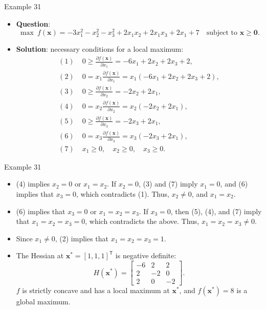 \documentclass[aspectratio=169,hyperref,UTF8,CJK]{beamer}
\newcommand{\trans}{\mathsf{T}}
\newcommand{\vect}[1]{\boldsymbol{#1}}
\begin{document}
\begin{frame}{Example 31}
  \scriptsize
  \begin{itemize}
    \item \textbf{Question}:
      \begin{equation*}
        \max\ f(\vect{x})=-3x_1^2-x_2^2-x_3^2+2x_1x_2+2x_1x_3+2x_1+7
        \quad\text{subject to }\vect{x}\ge\vect{0}.
      \end{equation*}
    \item \textbf{Solution}: necessary conditions for a local maximum:
      \begin{align*}
        (1)\;&0\ge\frac{\partial f(\vect{x})}{\partial x_1}=-6x_1+2x_2+2x_3+2,\\
        (2)\;&0=x_1\frac{\partial f(\vect{x})}{\partial x_1}=x_1(-6x_1+2x_2+2x_3+2),\\
        (3)\;&0\ge\frac{\partial f(\vect{x})}{\partial x_2}=-2x_2+2x_1,\\
        (4)\;&0=x_2\frac{\partial f(\vect{x})}{\partial x_2}=x_2(-2x_2+2x_1),\\
        (5)\;&0\ge\frac{\partial f(\vect{x})}{\partial x_3}=-2x_3+2x_1,\\
        (6)\;&0=x_3\frac{\partial f(\vect{x})}{\partial x_3}=x_3(-2x_3+2x_1),\\
        (7)\;&x_1\ge0,\quad x_2\ge0,\quad x_3\ge0.
      \end{align*}
  \end{itemize}
\end{frame}

\begin{frame}{Example 31}
  \scriptsize
  \begin{itemize}
    \item (4) implies $x_2=0$ or $x_1=x_2$. If $x_2=0$, (3) and (7) imply $x_1=0$, and (6) implies that $x_3=0$, which contradicts (1). Thus, $x_2\ne0$, and $x_1=x_2$.
    \item (6) implies that $x_3=0$ or $x_1=x_2=x_3$. If $x_3=0$, then (5), (4), and (7) imply that $x_1=x_2=x_3=0$, which contradicts the above. Thus, $x_1=x_2=x_3\ne0$.
    \item Since $x_1\ne0$, (2) implies that $x_1=x_2=x_3=1$.
    \item The Hessian at $\vect{x}^{*}=[1,1,1]^{\trans}$ is negative definite:
      \begin{equation*}
        H(\vect{x}^{*})=\begin{bmatrix}-6&2&2\\2&-2&0\\2&0&-2\end{bmatrix}.
      \end{equation*}
      $f$ is strictly concave and has a local maximum at $\vect{x}^{*}$, and $f(\vect{x}^{*})=8$ is a global maximum.
  \end{itemize}
\end{frame}
\end{document}
